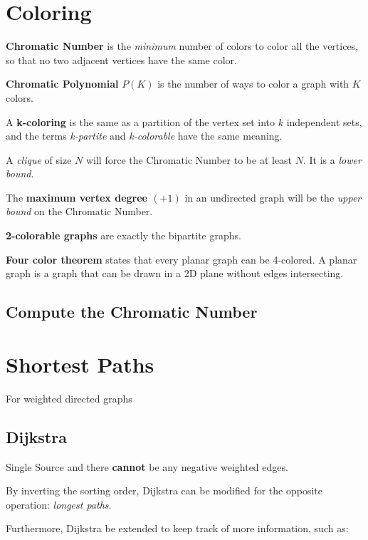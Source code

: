 \section{Coloring}

	\textbf{Chromatic Number} is the \textit{minimum} number of colors to color all the vertices, so that no two adjacent vertices have the same color.

	\textbf{Chromatic Polynomial} $P(K)$ is the number of ways to color a graph with $K$ colors. 

	A \textbf{k-coloring} is the same as a partition of the vertex set into $k$ independent sets, and the terms \textit{k-partite} and \textit{k-colorable} have the same meaning.
	
	A \textit{clique} of size $N$ will force the Chromatic Number to be at least $N$. It is a \textit{lower bound}.

	The \textbf{maximum vertex degree $(+1)$} in an undirected graph will be the \textit{upper bound} on the Chromatic Number.

	\textbf{2-colorable graphs} are exactly the bipartite graphs.

	\textbf{Four color theorem} states that every planar graph can be 4-colored. 
	A planar graph is a graph that can be drawn in a 2D plane without edges intersecting.

	\subsection{Compute the Chromatic Number}



\section{Shortest Paths}

	For weighted directed graphs

	\subsection{Dijkstra}

		Single Source and there \textbf{cannot} be any negative weighted edges. 


		By inverting the sorting order, Dijkstra can be modified for the opposite operation: \textit{longest paths}.

		Furthermore, Dijkstra be extended to keep track of more information, such as:

